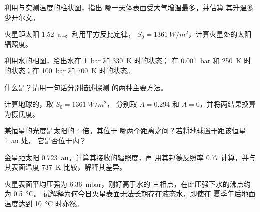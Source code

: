 \begin{exercise}[$\star$]\label{exo:g10:habitable-planet:2}
利用与实测温度的柱状图，指出
哪一天体表面受大气增温最多，并估算
其升温多少开尔文。
\end{exercise}

\begin{exercise}[$\star$]\label{exo:g10:habitable-planet:3}
火星距太阳 \qty{1.52}{au}。利用平方反比定律，
$S_0 = \qty{1361}{W/m^2}$，计算火星处的太阳辐照度。
\end{exercise}

\begin{exercise}[$\star$]\label{exo:g10:habitable-planet:4}
利用水的相图，给出水在 \qty{1}{bar} 和 \qty{330}{K} 时的状态；
在 \qty{0.001}{bar} 和 \qty{250}{K} 时的状态；在 \qty{100}{bar} 和
\qty{700}{K} 时的状态。
\end{exercise}

\begin{exercise}[$\star$]\label{exo:g10:habitable-planet:5}
什么是？请用一句话分别描述探测
的两种主要方法。
\end{exercise}

\begin{exercise}[$\star\star$]\label{exo:g10:habitable-planet:6}
计算地球的，取 $S_0 = \qty{1361}{W/m^2}$，
分别取 $A = 0.294$ 和 $A = 0$，并将两结果换算为摄氏度。
\end{exercise}

\begin{exercise}[$\star\star$]\label{exo:g10:habitable-planet:7}
某恒星的光度是太阳的 4 倍。其位于
哪两个距离之间？若将地球置于距该恒星 \qty{1}{au} 处，
它是否位于内？
\end{exercise}

\begin{exercise}[$\star\star$]\label{exo:g10:habitable-planet:8}
金星距太阳 \qty{0.723}{au}。计算其接收的辐照度，再
用其邦德反照率 0.77 计算，并与
其表面温度 \qty{737}{K} 比较，解释其差异。
\end{exercise}

\begin{exercise}[$\star\star$]\label{exo:g10:habitable-planet:9}
火星表面平均压强为 \qty{6.36}{mbar}，刚好高于水的
三相点，在此压强下水的沸点约为 \qty{0.5}{\degreeCelsius}。
试解释为何今日火星表面无法长期存在液态水，即使在
夏季午后地面温度达到 \qty{10}{\degreeCelsius} 时亦然。
\end{exercise}

